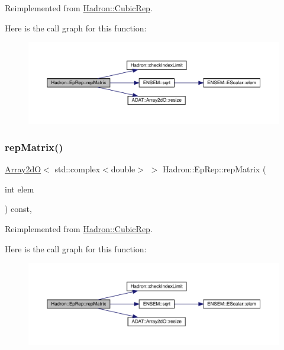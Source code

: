 Reimplemented from \mbox{\hyperlink{structHadron_1_1CubicRep_ac5d7e9e6f4ab1158b5fce3e4ad9e8005}{Hadron\+::\+Cubic\+Rep}}.

Here is the call graph for this function\+:
\nopagebreak
\begin{figure}[H]
\begin{center}
\leavevmode
\includegraphics[width=350pt]{d7/da2/structHadron_1_1EpRep_a51731663ac1ad2e9e41f7527b536e2b5_cgraph}
\end{center}
\end{figure}
\mbox{\label{structHadron_1_1EpRep_a51731663ac1ad2e9e41f7527b536e2b5}} 
\subsubsection{\texorpdfstring{repMatrix()}{repMatrix()}\hspace{0.1cm}{\footnotesize\ttfamily [3/3]}}
{\footnotesize\ttfamily \mbox{\hyperlink{classADAT_1_1Array2dO}{Array2dO}}$<$ std\+::complex$<$double$>$ $>$ Hadron\+::\+Ep\+Rep\+::rep\+Matrix (\begin{DoxyParamCaption}\item[{int}]{elem }\end{DoxyParamCaption}) const\hspace{0.3cm}{\ttfamily [inline]}, {\ttfamily [virtual]}}



Reimplemented from \mbox{\hyperlink{structHadron_1_1CubicRep_ac5d7e9e6f4ab1158b5fce3e4ad9e8005}{Hadron\+::\+Cubic\+Rep}}.

Here is the call graph for this function\+:
\nopagebreak
\begin{figure}[H]
\begin{center}
\leavevmode
\includegraphics[width=350pt]{d7/da2/structHadron_1_1EpRep_a51731663ac1ad2e9e41f7527b536e2b5_cgraph}
\end{center}
\end{figure}


